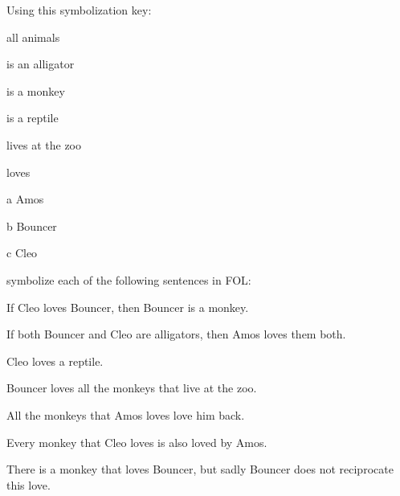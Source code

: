 \practiceproblems
\solutions
\problempart
Using this symbolization key:
\begin{ekey}
\item[\text{domain}] all animals
\item[\atom{A}{x}]  is an alligator
\item[\atom{M}{x}]  is a monkey
\item[\atom{R}{x}]  is a reptile
\item[\atom{Z}{x}]  lives at the zoo
\item[\atom{L}{x,y}]  loves 
\item[a] Amos
\item[b] Bouncer
\item[c] Cleo
\end{ekey}
symbolize each of the following sentences in FOL:
\begin{compactlist}
\item If Cleo loves Bouncer, then Bouncer is a monkey.
\item If both Bouncer and Cleo are alligators, then Amos loves them both.
\item Cleo loves a reptile.
\item Bouncer loves all the monkeys that live at the zoo.
\item All the monkeys that Amos loves love him back.
\item Every monkey that Cleo loves is also loved by Amos.
\item There is a monkey that loves Bouncer, but sadly Bouncer does not reciprocate this love.
\end{compactlist}

